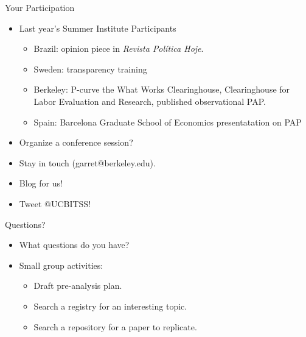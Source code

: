 \documentclass{beamer}
\begin{document}
\begin{frame}{Your Participation}
\begin{itemize}
\item Last year's Summer Institute Participants
\begin{itemize}
\item Brazil: opinion piece in \textit{Revista Política Hoje}.  \href{http://bitss.org/2014/11/19/replication-brazil/}{}
\item Sweden: transparency training \href{http://bitss.org/2014/10/28/swedish-graduate-student-training/}{}
\item Berkeley: P-curve the What Works Clearinghouse, Clearinghouse for Labor Evaluation and Research, published observational PAP. \href{http://obsstudies.org/journal.php?id=17}{}
\item Spain: Barcelona Graduate School of Economics presentatation on PAP
\end{itemize}
\item Organize a conference session?
\item Stay in touch (garret@berkeley.edu).
\item Blog for us!
\item Tweet @UCBITSS!
\end{itemize}
\end{frame}

\begin{frame}{Questions?}
\begin{itemize}
\item What questions do you have?
\item Small group activities:
\begin{itemize}
\item Draft pre-analysis plan.
\item Search a registry for an interesting topic.
\item Search a repository for a paper to replicate.
\end{itemize}
\end{itemize}
\end{frame}
\end{document}
